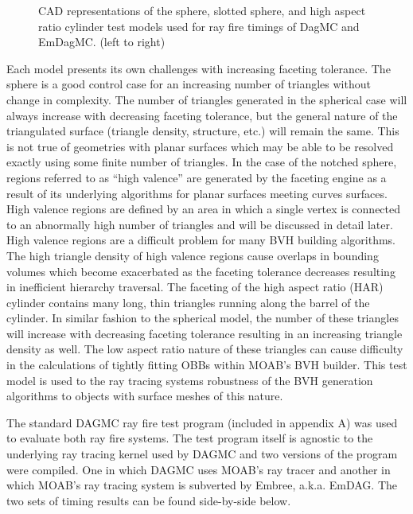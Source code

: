 \documentclass[12pt, a4paper]{article}
\begin{document}
\begin{figure}
\begin{center}
    \caption{CAD representations of the sphere, slotted sphere, and high aspect ratio cylinder test models used for ray fire timings of DagMC and EmDagMC. (left to right) \label{models}}

  \end{center}
\vspace{-0.3cm}

\end{figure} 


Each model presents its own challenges with increasing faceting tolerance. The sphere is a good control case for an increasing number of triangles without change in complexity. The number of triangles generated in the spherical case will always increase with decreasing faceting tolerance, but the general nature of the triangulated surface (triangle density, structure, etc.) will remain the same. This is not true of geometries with planar surfaces which may be able to be resolved exactly using some finite number of triangles. In the case of the notched sphere, regions referred to as ``high valence'' are generated by the faceting engine as a result of its underlying algorithms for planar surfaces meeting curves surfaces. High valence regions are defined by an area in which a single vertex is connected to an abnormally high number of triangles and will be discussed in detail later. High valence regions are a difficult problem for many BVH building algorithms. The high triangle density of high valence regions cause overlaps in bounding volumes which become exacerbated as the faceting tolerance decreases resulting in inefficient hierarchy traversal. The faceting of the high aspect ratio (HAR) cylinder contains many long, thin triangles running along the barrel of the cylinder. In similar fashion to the spherical model, the number of these triangles will increase with decreasing faceting tolerance resulting in an increasing triangle density as well. The low aspect ratio nature of these triangles can cause difficulty in the calculations of tightly fitting OBBs within MOAB's BVH builder. This test model is used to the ray tracing systems robustness of the BVH generation algorithms to objects with surface meshes of this nature.

The standard DAGMC ray fire test program (included in appendix A) was used to evaluate both ray fire systems. The test program itself is agnostic to the underlying ray tracing kernel used by DAGMC and two versions of the program were compiled. One in which DAGMC uses MOAB's ray tracer and another in which MOAB's ray tracing system is subverted by Embree, a.k.a. EmDAG. The two sets of timing results can be found side-by-side below.
\end{document}
